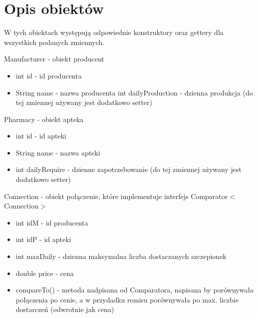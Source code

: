 \documentclass{article}
\begin{document}
\section{Opis obiektów}
W tych obiektach występują odpowiednie konstruktory oraz gettery dla wszystkich podanych zmiennych.
    \item Manufacturer - obiekt producent
        \begin{itemize}
        \item int id - id producenta
        \item String name - nazwa producenta
        \iten int dailyProduction - dzienna produkcja (do tej zmiennej używany jest dodatkowo setter)
    \end{itemize}
    \item Pharmacy - obiekt apteka
        \begin{itemize}
            \item int id - id apteki
            \item String name - nazwa apteki
            \item int dailyRequire - dzienne zapotrzebowanie (do tej zmiennej używany jest dodatkowo setter)
        \end{itemize}
    \item Connection - obiekt połączenie, które implementuje interfejs Comparator$<$Connection$>$
        \begin{itemize}
            \item int idM - id producenta
            \item int idP - id apteki
            \item int maxDaily - dzienna maksymalna liczba dostaczanych szczepionek
            \item double price - cena
            \item compareTo() - metoda nadpisana od Comparatora, napisana by porównywała połączenia po cenie, a w przydadku remisu porównywała po max. liczbie dostarczeń (odwrotnie jak cena)
        \end{itemize}
    
\end{document}
